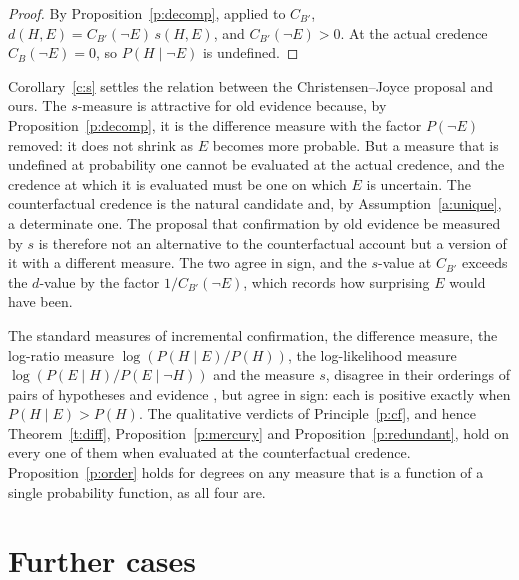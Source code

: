 \documentclass{situationist-preprint}
\begin{document}
\begin{proof}
By Proposition~\ref{p:decomp}, applied to $C_{B'}$, $d(H, E) = C_{B'}(\neg E)\, s(H, E)$, and $C_{B'}(\neg E) > 0$. At the actual credence $C_B(\neg E) = 0$, so $P(H \mid \neg E)$ is undefined.
\end{proof}

Corollary~\ref{c:s} settles the relation between the Christensen--Joyce proposal and ours. The $s$-measure is attractive for old evidence because, by Proposition~\ref{p:decomp}, it is the difference measure with the factor $P(\neg E)$ removed: it does not shrink as $E$ becomes more probable. But a measure that is undefined at probability one cannot be evaluated at the actual credence, and the credence at which it is evaluated must be one on which $E$ is uncertain. The counterfactual credence is the natural candidate and, by Assumption~\ref{a:unique}, a determinate one. The proposal that confirmation by old evidence be measured by $s$ is therefore not an alternative to the counterfactual account but a version of it with a different measure. The two agree in sign, and the $s$-value at $C_{B'}$ exceeds the $d$-value by the factor $1/C_{B'}(\neg E)$, which records how surprising $E$ would have been.

\begin{remark}\label{r:sign}
The standard measures of incremental confirmation, the difference measure, the log-ratio measure $\log(P(H \mid E)/P(H))$, the log-likelihood measure $\log(P(E \mid H)/P(E \mid \neg H))$ and the measure $s$, disagree in their orderings of pairs of hypotheses and evidence \citep{Fitelson1999}, but agree in sign: each is positive exactly when $P(H \mid E) > P(H)$. The qualitative verdicts of Principle~\ref{p:cf}, and hence Theorem~\ref{t:diff}, Proposition~\ref{p:mercury} and Proposition~\ref{p:redundant}, hold on every one of them when evaluated at the counterfactual credence. Proposition~\ref{p:order} holds for degrees on any measure that is a function of a single probability function, as all four are.
\end{remark}

\section{Further cases}\label{s:cases}
\end{document}
